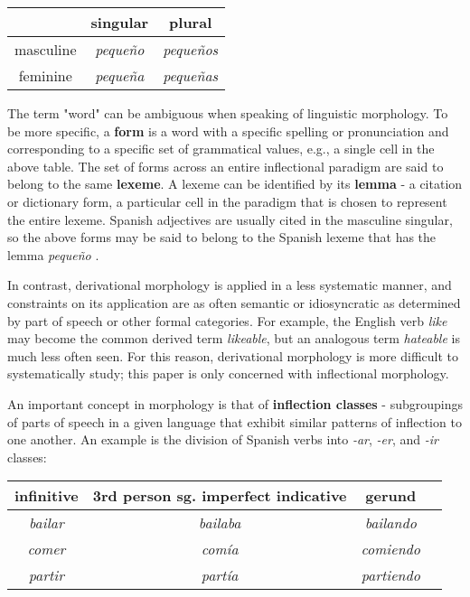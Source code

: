 \begin{center}
\begin{tabular}{|c||c|c|}
\hline
& singular & plural \\
\hline \hline
masculine & \textit{pequeño} & \textit{pequeños} \\
\hline 
feminine & \textit{pequeña} & \textit{pequeñas} \\
\hline
\end{tabular}
\end{center}

 The term "word" can be ambiguous when speaking of linguistic morphology. To be more specific, a \textbf{form} is a word with a specific spelling or pronunciation and corresponding to a specific set of grammatical values, e.g., a single cell in the above table. The set of forms across an entire inflectional paradigm are said to belong to the same \textbf{lexeme}. A lexeme can be identified by its \textbf{lemma} - a citation or dictionary form, a particular cell in the paradigm that is chosen to represent the entire lexeme. Spanish adjectives are usually cited in the masculine singular, so the above forms may be said to belong to the Spanish lexeme that has the lemma \textit{pequeño} \parencite{Hogan2010}.

In contrast, derivational morphology is applied in a less systematic manner, and constraints on its application are as often semantic or idiosyncratic as determined by part of speech or other formal categories. For example, the English verb \textit{like} may become the common derived term \textit{likeable}, but an analogous term \textit{hateable} is much less often seen. For this reason, derivational morphology is more difficult to systematically study; this paper is only concerned with inflectional morphology.

An important concept in morphology is that of \textbf{inflection classes} - subgroupings of parts of speech in a given language that exhibit similar patterns of inflection to one another. An example is the division of Spanish verbs into \textit{-ar}, \textit{-er}, and \textit{-ir} classes:

\begin{center}
\begin{tabular}{|c|c|c|c|}
\hline
infinitive & 3rd person sg. imperfect indicative & gerund \\
\hline \hline
\textit{bailar} & \textit{bailaba} & \textit{bailando} \\
\hline 
\textit{comer} & \textit{comía} & \textit{comiendo} \\
\hline 
\textit{partir} & \textit{partía} & \textit{partiendo} \\
\hline 
\end{tabular}
\end{center}

